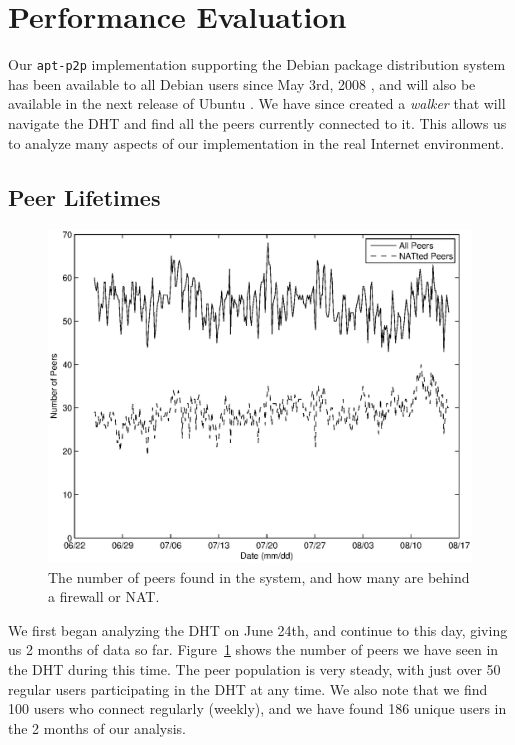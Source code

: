 \documentclass[conference]{IEEEtran}
\begin{document}

\section{Performance Evaluation}
\label{analysis}

Our \texttt{apt-p2p} implementation supporting the Debian package
distribution system has been available to all Debian users since May
3rd, 2008 \cite{apt-p2p-debian}, and will also be available in the
next release of Ubuntu \cite{apt-p2p-ubuntu}. We have since created
a \emph{walker} that will navigate the DHT and find all the peers
currently connected to it. This allows us to analyze many aspects of
our implementation in the real Internet environment.

\subsection{Peer Lifetimes}
\label{peer_life}

\begin{figure}
\centering
\includegraphics[width=0.80\columnwidth]{AptP2PWalker-peers.eps}
\caption{The number of peers found in the system, and how many are
behind a firewall or NAT.}
\label{walker_peers}
\end{figure}

We first began analyzing the DHT on June 24th, and continue to this
day, giving us 2 months of data so far. Figure~\ref{walker_peers}
shows the number of peers we have seen in the DHT during this time.
The peer population is very steady, with just over 50 regular users
participating in the DHT at any time. We also note that we find 100
users who connect regularly (weekly), and we have found 186 unique
users in the 2 months of our analysis.
\end{document}
